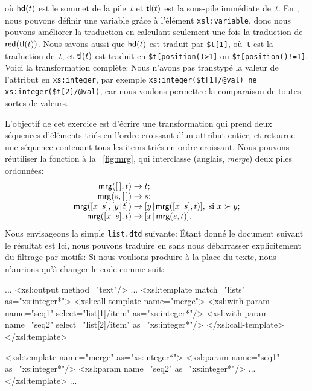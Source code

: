 où \(\textsf{hd}(t)\)  est le sommet de la
pile~\(t\) et \(\textsf{tl}(t)\)  est la sous-pile
immédiate de~\(t\). En \XSLT, nous pouvons définir une variable grâce
à l'élément \texttt{xsl:variable}, donc nous pouvons améliorer la
traduction en calculant seulement une fois la traduction de
\(\textsf{red}(\textsf{tl}(t))\). Nous savons aussi que \(\textsf{hd}(t)\) est
traduit par \texttt{\$t[1]}, où~\texttt{t} est la traduction de~\(t\),
et \(\textsf{tl}(t)\) est traduit en \texttt{\$t[position()>1]} ou
\texttt{\$t[position()!=1]}. Voici la transformation complète:
\noindent Nous n'avons pas transtypé la valeur de l'attribut en
\texttt{xs:integer}, par exemple \texttt{xs:integer(\$t[1]/@val) ne
  xs:integer(\$t[2]/@val)}, car nous voulons permettre la comparaison
de toutes sortes de valeurs.


\label{par:merging}

L'objectif de cet exercice est d'écrire une transformation \XSLT qui
prend deux séquences d'éléments triés en l'ordre croissant d'un
attribut entier, et retourne une séquence contenant tous les items
triés en ordre croissant. Nous pouvons réutiliser la fonction
 à la \fig~\vref{fig:mrg}, qui interclasse (anglais,
\emph{merge}) deux piles ordonnées:
\begin{equation*}
\begin{array}{r@{\;}l@{\;}l}
\fun{mrg}(\el,t)         & \rightarrow & t;\\
\fun{mrg}(s,\el)         & \rightarrow & s;\\
\fun{mrg}(\cons{x}{s},\cons{y}{t}) & \rightarrow
& \cons{y}{\fun{mrg}(\cons{x}{s},t)},\;\text{si \(x \succ y\)};\\
\fun{mrg}(\cons{x}{s},t) & \rightarrow & \cons{x}{\fun{mrg}(s,t)}.
\end{array}
\end{equation*}
Nous envisageons la simple \DTD \texttt{list.dtd} suivante:
\noindent Étant donné le document \XML suivant
\noindent le résultat est
Ici, nous pouvons traduire  en \XSLT sans nous débarrasser
explicitement du filtrage par motifs:
\noindent Si nous voulions produire à la place du texte, nous
n'aurions qu'à changer le code comme suit:
\begin{sverb}
...
  <xsl:output method="text"/>
...
  <xsl:template match="lists" as="xs:integer*">
    <xsl:call-template name="merge">
      <xsl:with-param name="seq1" select="list[1]/item"
                                  as="xs:integer*"/>
      <xsl:with-param name="seq2" select="list[2]/item"
                                  as="xs:integer*"/>
    </xsl:call-template>
  </xsl:template>

  <xsl:template name="merge" as="xs:integer*">
    <xsl:param name="seq1" as="xs:integer*"/>
    <xsl:param name="seq2" as="xs:integer*"/>
    ...
  </xsl:template>
...
\end{sverb}


